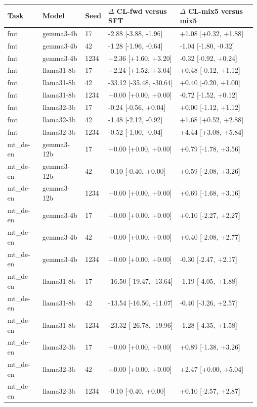 \begin{table}[t]
\centering\small
\begin{tabular}{lllll}
\toprule
Task & Model & Seed & $\Delta$ CL-fwd versus SFT & $\Delta$ CL-mix5 versus mix5 \\
\midrule
fmt & gemma3-4b & 17 & -2.88 [-3.88, -1.96] & +1.08 [+0.32, +1.88] \\
fmt & gemma3-4b & 42 & -1.28 [-1.96, -0.64] & -1.04 [-1.80, -0.32] \\
fmt & gemma3-4b & 1234 & +2.36 [+1.60, +3.20] & -0.32 [-0.92, +0.24] \\
fmt & llama31-8b & 17 & +2.24 [+1.52, +3.04] & +0.48 [-0.12, +1.12] \\
fmt & llama31-8b & 42 & -33.12 [-35.48, -30.64] & +0.40 [-0.20, +1.00] \\
fmt & llama31-8b & 1234 & +0.00 [+0.00, +0.00] & -0.72 [-1.52, +0.12] \\
fmt & llama32-3b & 17 & -0.24 [-0.56, +0.04] & +0.00 [-1.12, +1.12] \\
fmt & llama32-3b & 42 & -1.48 [-2.12, -0.92] & +1.68 [+0.52, +2.88] \\
fmt & llama32-3b & 1234 & -0.52 [-1.00, -0.04] & +4.44 [+3.08, +5.84] \\
mt\_de-en & gemma3-12b & 17 & +0.00 [+0.00, +0.00] & +0.79 [-1.78, +3.56] \\
mt\_de-en & gemma3-12b & 42 & -0.10 [-0.40, +0.00] & +0.59 [-2.08, +3.26] \\
mt\_de-en & gemma3-12b & 1234 & +0.00 [+0.00, +0.00] & +0.69 [-1.68, +3.16] \\
mt\_de-en & gemma3-4b & 17 & +0.00 [+0.00, +0.00] & +0.10 [-2.27, +2.27] \\
mt\_de-en & gemma3-4b & 42 & +0.00 [+0.00, +0.00] & +0.40 [-2.08, +2.77] \\
mt\_de-en & gemma3-4b & 1234 & +0.00 [+0.00, +0.00] & -0.30 [-2.47, +2.17] \\
mt\_de-en & llama31-8b & 17 & -16.50 [-19.47, -13.64] & -1.19 [-4.05, +1.88] \\
mt\_de-en & llama31-8b & 42 & -13.54 [-16.50, -11.07] & -0.40 [-3.26, +2.57] \\
mt\_de-en & llama31-8b & 1234 & -23.32 [-26.78, -19.96] & -1.28 [-4.35, +1.58] \\
mt\_de-en & llama32-3b & 17 & +0.00 [+0.00, +0.00] & +0.89 [-1.38, +3.26] \\
mt\_de-en & llama32-3b & 42 & +0.00 [+0.00, +0.00] & +2.47 [+0.00, +5.04] \\
mt\_de-en & llama32-3b & 1234 & -0.10 [-0.40, +0.00] & +0.10 [-2.57, +2.87] \\

\end{tabular}
\end{table}
